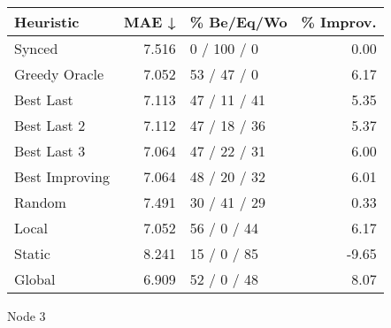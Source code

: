 \begin{tabular}{lrlr}
\toprule
\textbf{Heuristic} & \textbf{MAE ↓} & \textbf{\% Be/Eq/Wo} & \textbf{\% Improv.} \\
\midrule
            Synced &          7.516 &          0 / 100 / 0 &                0.00 \\
     Greedy Oracle &          7.052 &          53 / 47 / 0 &                6.17 \\
         Best Last &          7.113 &         47 / 11 / 41 &                5.35 \\
       Best Last 2 &          7.112 &         47 / 18 / 36 &                5.37 \\
       Best Last 3 &          7.064 &         47 / 22 / 31 &                6.00 \\
    Best Improving &          7.064 &         48 / 20 / 32 &                6.01 \\
            Random &          7.491 &         30 / 41 / 29 &                0.33 \\
             Local &          7.052 &          56 / 0 / 44 &                6.17 \\
            Static &          8.241 &          15 / 0 / 85 &               -9.65 \\
            Global &          6.909 &          52 / 0 / 48 &                8.07 \\
\bottomrule
\end{tabular}
\caption{Node 3}
\label{tab:ds_non_lr05_le1_bs2_3}

